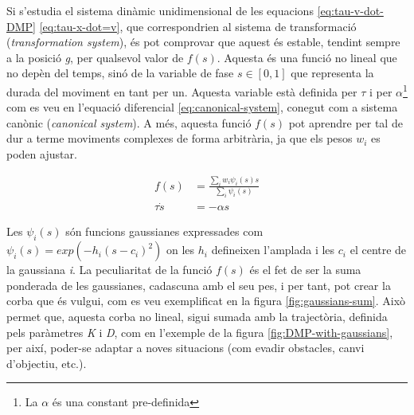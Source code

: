 \documentclass[12pt,a4paper,final,twoside]{report}
\begin{document}
Si s'estudia el sistema dinàmic unidimensional de les equacions \eqref{eq:tau-v-dot-DMP} \eqref{eq:tau-x-dot=v}, que correspondrien al sistema de transformació (\textit{transformation system}), és pot comprovar que aquest és estable, tendint sempre a la posició \textit{g}, per qualsevol valor de $f(s)$. Aquesta és una funció no lineal que no depèn del temps, sinó de la variable de fase $s\in [0,1]$ que representa la durada del moviment en tant per un. Aquesta variable està definida per $\tau$ i per $\alpha$\footnote{La $\alpha$ és una constant pre-definida} com es veu en l'equació diferencial \eqref{eq:canonical-system}, conegut com a sistema canònic (\textit{canonical system}). A més, aquesta funció $f(s)$ pot aprendre per tal de dur a terme moviments complexes de forma arbitrària, ja que els pesos $w_i$ es poden ajustar.

\begin{align}
f(s) &= \frac{\sum_i w_i \psi_i(s)s}{\sum_i \psi_i(s)} \\
\tau \dot{s} &= - \alpha s \label{eq:canonical-system}
\end{align}

Les $\psi_i(s)$ són funcions gaussianes expressades com $\psi_i(s)=exp(-h_i(s-c_i)^2)$ on les $h_i$ defineixen l'amplada i les $c_i$ el centre de la gaussiana \textit{i}. La peculiaritat de la funció $f(s)$ és el fet de ser la suma ponderada de les gaussianes, cadascuna amb el seu pes, i per tant, pot crear la corba que és vulgui, com es veu exemplificat en la figura \ref{fig:gaussians-sum}. Això permet que, aquesta corba no lineal, sigui sumada amb la trajectòria, definida pels paràmetres \textit{K} i \textit{D}, com en l'exemple de la figura \ref{fig:DMP-with-gaussians}, per així, poder-se adaptar a noves situacions (com evadir obstacles, canvi d'objectiu, etc.).
\end{document}
